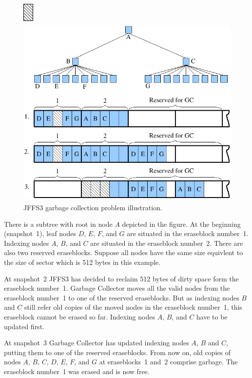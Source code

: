 %
%
\begin{figure}[h]
\begin{center}
\begin{htmlonly}
\includegraphics{pics/gcprobl-01.png}
\end{htmlonly}
\includegraphics[width=120mm,height=96mm]{pics/gcprobl-01.pdf}
\end{center}
\caption{JFFS3 garbage collection problem illustration.}
\label{ref_FigureGCProbl_01}
\end{figure}

There is a subtree with root in node $A$ depicted in the figure. At the
beginning (snapshot~1), leaf nodes $D$, $E$, $F$, and $G$ are situated in the
eraseblock number~1. Indexing nodes $A$, $B$, and $C$ are situated in the
eraseblock number~2. There are also two reserved eraseblocks. Suppose all nodes
have the same size equivlent to the size of sector which is 512 bytes in
this example.

At snapshot~2 JFFS3 has decided to reclaim 512 bytes of dirty space form
the eraseblock number~1. Garbage Collector moves all the valid nodes from the
eraseblock number~1 to one of the reserved eraseblocks. But as indexing nodes
$B$ and $C$ still refer old copies of the moved nodes in the eraseblock
number~1, this eraseblock cannot be erased so far. Indexing nodes $A$, $B$, and
$C$ have to be updated first.

At snapshot~3 Garbage Collector has updated indexing nodes $A$, $B$ and $C$,
putting them to one of the reserved eraseblocks. From now on, old copies of
nodes $A$, $B$, $C$, $D$, $E$, $F$, and $G$ at eraseblocks~1 and~2 comprise
garbage. The eraseblock number~1 was erased and is now free.

